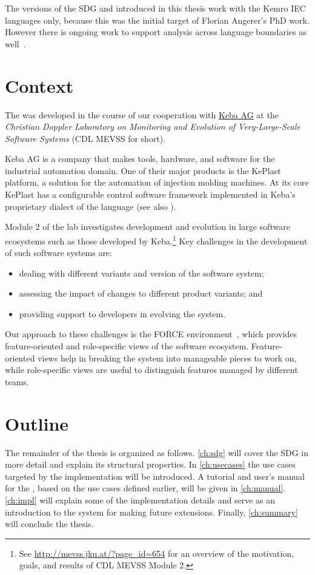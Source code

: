 The versions of the SDG and \SB introduced in this thesis work with the Kemro IEC languages only, because this was the 
initial target of Florian Angerer's PhD work. However there is ongoing work to support analysis across language 
boundaries as well~\cite{DBLP:conf/kbse/Angerer14}.


\section{Context} \label{sec:intro-context}

The \SB was developed in the course of our cooperation with \href{http://www.keba.com}{Keba AG} at the \emph{Christian 
Doppler Laboratory on Monitoring and Evolution of Very-Large-Scale Software Systems} (CDL MEVSS for short).

Keba AG is a company that makes tools, hardware, and software for the industrial automation domain. One of their major 
products is the KePlast platform, a solution for the automation of injection molding machines. At its core KePlast has 
a configurable control software framework implemented in Keba's proprietary dialect of the \IEC language (see also 
\cite[sec.~3.1]{DBLP:conf/splc/AngererPLGG14}).

Module 2 of the lab investigates development and evolution in large software ecosystems such as those developed by 
Keba.\footnote{See \url{http://mevss.jku.at/?page_id=654} for an overview of the motivation, goals, and results of CDL 
MEVSS Module 2.}
Key challenges in the development of such software systems are:

\begin{itemize}
  \item dealing with different variants and version of the software system;
  \item assessing the impact of changes to different product variants; and
  \item providing support to developers in evolving the system.
\end{itemize}

Our approach to these challenges is the FORCE environment~\cite{HinterreiterDA}, which provides feature-oriented and 
role-specific views of the software ecosystem. Feature-oriented views help in breaking the system into manageable 
pieces to work on, while role-specific views are useful to distinguish features managed by different teams.


\section{Outline}

The remainder of the thesis is organized as follows.
\autoref{ch:sdg} will cover the SDG in more detail and explain its structural properties.
In \autoref{ch:usecases} the use cases targeted by the \SB implementation will be introduced.
A tutorial and user's manual for the \SB, based on the use cases defined earlier, will be given in \autoref{ch:manual}.
\autoref{ch:impl} will explain some of the implementation details and serve as an introduction to the system for making
future extensions.
Finally, \autoref{ch:summary} will conclude the thesis.
